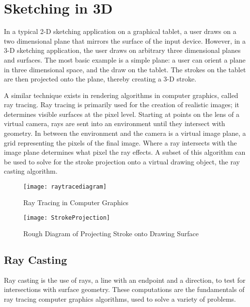 \chapter{Sketching in 3D}

In a typical 2-D sketching application on a graphical tablet, a user draws on a two dimensional plane that mirrors the surface of the input device.
However, in a 3-D sketching application, the user draws on arbitrary three dimensional planes and surfaces.
The most basic example is a simple plane: a user can orient a plane in three dimensional space, and the draw on the tablet.
The strokes on the tablet are then projected onto the plane, thereby creating a 3-D stroke.

A similar technique exists in rendering algorithms in computer graphics, called ray tracing.
Ray tracing is primarily used for the creation of realistic images; it determines visible surfaces at the pixel level. 
Starting at points on the lens of a virtual camera, rays are sent into an environment until they intersect with geometry.
In between the environment and the camera is a virtual image plane, a grid representing the pixels of the final image.
Where a ray intersects with the image plane determines what pixel the ray effects.
A subset of this algorithm can be used to solve for the stroke projection onto a virtual drawing object, the ray casting algorithm.


\begin{figure}
\texttt{[image: raytracediagram]}
\caption{Ray Tracing in Computer Graphics}
\end{figure} 
\begin{figure}
\texttt{[image: StrokeProjection]}
\caption{Rough Diagram of Projecting Stroke onto Drawing Surface}
\end{figure} 

\section{Ray Casting}

Ray casting is the use of rays, a line with an endpoint and a direction, to test for intersections with surface geometry.
These computations are the fundamentals of ray tracing computer graphics algorithms, used to solve a variety of problems.

